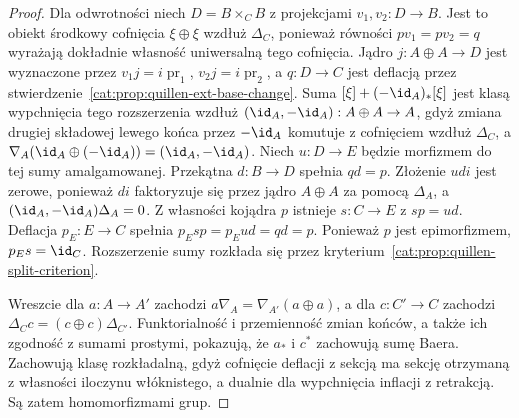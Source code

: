 \begin{proof}
Dla odwrotności niech $D=B\times_C B$ z projekcjami $v_1,v_2:D\to B$. Jest to obiekt środkowy cofnięcia $\xi\oplus\xi$ wzdłuż $\Delta_C$, ponieważ równości $pv_1=pv_2=q$ wyrażają dokładnie własność uniwersalną tego cofnięcia. Jądro $j:A\oplus A\to D$ jest wyznaczone przez $v_1j=i\operatorname{pr}_1$, $v_2j=i\operatorname{pr}_2$, a $q:D\to C$ jest deflacją przez stwierdzenie~\ref{cat:prop:quillen-ext-base-change}. Suma $[\xi]+(-\id_A)_*[\xi]$ jest klasą wypchnięcia tego rozszerzenia wzdłuż $(\id_A,-\id_A):A\oplus A\to A$, gdyż zmiana drugiej składowej lewego końca przez $-\id_A$ komutuje z cofnięciem wzdłuż $\Delta_C$, a $\nabla_A(\id_A\oplus(-\id_A))=(\id_A,-\id_A)$. Niech $u:D\to E$ będzie morfizmem do tej sumy amalgamowanej. Przekątna $d:B\to D$ spełnia $qd=p$. Złożenie $udi$ jest zerowe, ponieważ $di$ faktoryzuje się przez jądro $A\oplus A$ za pomocą $\Delta_A$, a $(\id_A,-\id_A)\Delta_A=0$. Z własności kojądra $p$ istnieje $s:C\to E$ z $sp=ud$. Deflacja $p_E:E\to C$ spełnia $p_Esp=p_Eud=qd=p$. Ponieważ $p$ jest epimorfizmem, $p_Es=\id_C$. Rozszerzenie sumy rozkłada się przez kryterium~\ref{cat:prop:quillen-split-criterion}.

Wreszcie dla $a:A\to A'$ zachodzi $a\nabla_A=\nabla_{A'}(a\oplus a)$, a dla $c:C'\to C$ zachodzi $\Delta_Cc=(c\oplus c)\Delta_{C'}$. Funktorialność i przemienność zmian końców, a także ich zgodność z sumami prostymi, pokazują, że $a_*$ i $c^*$ zachowują sumę Baera. Zachowują klasę rozkładalną, gdyż cofnięcie deflacji z sekcją ma sekcję otrzymaną z własności iloczynu włóknistego, a dualnie dla wypchnięcia inflacji z retrakcją. Są zatem homomorfizmami grup.
\end{proof}

